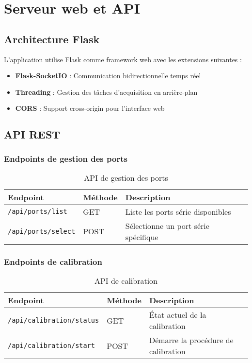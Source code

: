 \documentclass[12pt,a4paper]{article}
\begin{document}
\section{Serveur web et API}

\subsection{Architecture Flask}

L'application utilise Flask comme framework web avec les extensions suivantes :
\begin{itemize}
    \item \textbf{Flask-SocketIO} : Communication bidirectionnelle temps réel
    \item \textbf{Threading} : Gestion des tâches d'acquisition en arrière-plan
    \item \textbf{CORS} : Support cross-origin pour l'interface web
\end{itemize}

\subsection{API REST}

\subsubsection{Endpoints de gestion des ports}

\begin{table}[H]
\centering
\begin{tabular}{|l|l|p{7cm}|}
\hline
\textbf{Endpoint} & \textbf{Méthode} & \textbf{Description} \\
\hline
\texttt{/api/ports/list} & GET & Liste les ports série disponibles \\
\hline
\texttt{/api/ports/select} & POST & Sélectionne un port série spécifique \\
\hline
\end{tabular}
\caption{API de gestion des ports}
\end{table}

\subsubsection{Endpoints de calibration}

\begin{table}[H]
\centering
\begin{tabular}{|l|l|p{7cm}|}
\hline
\textbf{Endpoint} & \textbf{Méthode} & \textbf{Description} \\
\hline
\texttt{/api/calibration/status} & GET & État actuel de la calibration \\
\hline
\texttt{/api/calibration/start} & POST & Démarre la procédure de calibration \\
\hline
\end{tabular}
\caption{API de calibration}
\end{table}
\end{document}
